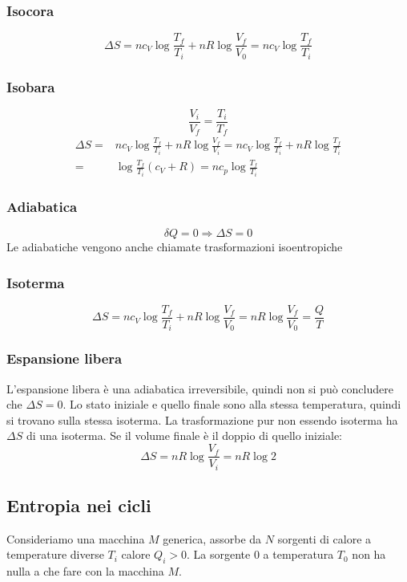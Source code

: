 \subsubsection{Isocora}
$$\Delta S=nc_V\log\frac{T_f}{T_i}+nR\log\frac{V_f}{V_0}=nc_V\log\frac{T_f}{T_i}$$
\subsubsection{Isobara}
$$\frac{V_i}{V_f}=\frac{T_i}{T_f}$$
\begin{align*}
\Delta S=&nc_V\log\frac{T_f}{T_i}+nR\log\frac{V_f}{V_i}=nc_V\log\frac{T_f}{T_i}+nR\log\frac{T_f}{T_i}\\
=&\log\frac{T_f}{T_i}(c_V+R)=nc_p\log\frac{T_f}{T_i}
\end{align*}
\subsubsection{Adiabatica}
$$\delta Q=0 \Rightarrow \Delta S=0$$
Le adiabatiche vengono anche chiamate trasformazioni isoentropiche
\subsubsection{Isoterma}
$$\Delta S=nc_V\log\frac{T_f}{T_i}+nR\log\frac{V_f}{V_0}=nR\log\frac{V_f}{V_0}=\frac{Q}{T}$$
\subsubsection{Espansione libera}
L'espansione libera è una adiabatica irreversibile, quindi non si può concludere che $\Delta S=0$. Lo stato iniziale e quello finale sono alla stessa temperatura, quindi si trovano sulla stessa isoterma. La trasformazione pur non essendo isoterma ha $\Delta S$ di una isoterma. Se il volume finale è il doppio di quello iniziale:
$$\Delta S=nR\log\frac{V_f}{V_i}=nR\log 2$$

\subsection{Entropia nei cicli}
Consideriamo una macchina $M$ generica, assorbe da $N$ sorgenti di calore a temperature diverse $T_i$ calore $Q_i>0$. La sorgente $0$ a temperatura $T_0$ non ha nulla a che fare con la macchina $M$.

